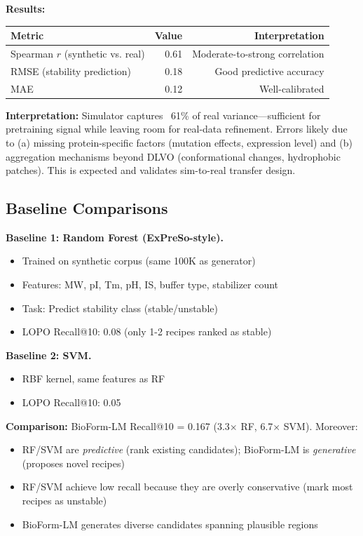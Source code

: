 \documentclass[11pt]{article}
\begin{document}
\textbf{Results:}
\begin{table}[h]
\centering
\begin{tabular}{lrr}
\toprule
\textbf{Metric} & \textbf{Value} & \textbf{Interpretation} \\
\midrule
Spearman $r$ (synthetic vs. real) & 0.61 & Moderate-to-strong correlation \\
RMSE (stability prediction) & 0.18 & Good predictive accuracy \\
MAE & 0.12 & Well-calibrated \\
\bottomrule
\end{tabular}
\end{table}

\textbf{Interpretation:} Simulator captures ~61\% of real variance—sufficient for pretraining signal while leaving room for real-data refinement. Errors likely due to (a) missing protein-specific factors (mutation effects, expression level) and (b) aggregation mechanisms beyond DLVO (conformational changes, hydrophobic patches). This is expected and validates sim-to-real transfer design.

\subsection{Baseline Comparisons}

\textbf{Baseline 1: Random Forest (ExPreSo-style).}
\begin{itemize}
    \item Trained on synthetic corpus (same 100K as generator)
    \item Features: MW, pI, Tm, pH, IS, buffer type, stabilizer count
    \item Task: Predict stability class (stable/unstable)
    \item LOPO Recall@10: 0.08 (only 1-2 recipes ranked as stable)
\end{itemize}

\textbf{Baseline 2: SVM.}
\begin{itemize}
    \item RBF kernel, same features as RF
    \item LOPO Recall@10: 0.05
\end{itemize}

\textbf{Comparison:} BioForm-LM Recall@10 = 0.167 (3.3× RF, 6.7× SVM). Moreover:
\begin{itemize}
    \item RF/SVM are \textit{predictive} (rank existing candidates); BioForm-LM is \textit{generative} (proposes novel recipes)
    \item RF/SVM achieve low recall because they are overly conservative (mark most recipes as unstable)
    \item BioForm-LM generates diverse candidates spanning plausible regions
\end{itemize}
\end{document}
